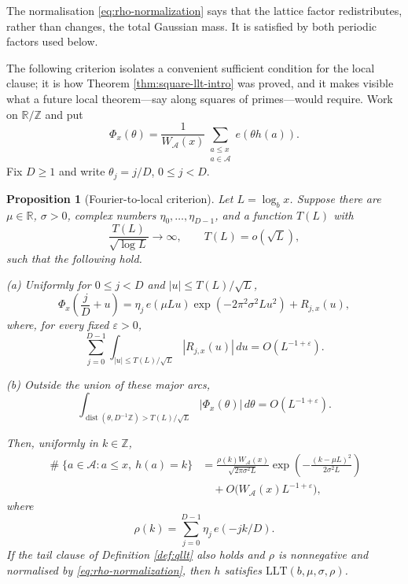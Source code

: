\documentclass[11pt,reqno]{amsart}
\theoremstyle{plain}
\newtheorem{proposition}[theorem]{Proposition}
\theoremstyle{definition}
\newcommand{\Z}{\mathbb{Z}}
\newcommand{\R}{\mathbb{R}}
\newcommand{\eps}{\varepsilon}
\newcommand{\ee}[1]{e\!\left(#1\right)}
\newcommand{\1}{\mathbf 1}
\DeclareMathOperator{\Card}{\#}
\DeclareMathOperator{\dist}{dist}
\begin{document}
The normalisation \eqref{eq:rho-normalization} says that the lattice factor redistributes, rather than changes, the total Gaussian mass.  It is satisfied by both periodic factors used below.

The following criterion isolates a convenient sufficient condition for the local clause; it is how Theorem \ref{thm:square-llt-intro} was proved, and it makes visible what a future local theorem---say along squares of primes---would require.  Work on $\R/\Z$ and put
\[
 \Phi_x(\theta)=\frac1{W_{\mathcal A}(x)}
 \sum_{\substack{a\le x\\a\in\mathcal A}}\ee{\theta h(a)}.
\]
Fix $D\ge1$ and write $\theta_j=j/D$, $0\le j<D$.

\begin{proposition}[Fourier-to-local criterion]\label{prop:fourier-criterion}
Let $L=\log_bx$.  Suppose there are $\mu\in\R$, $\sigma>0$, complex numbers $\eta_0,\ldots,\eta_{D-1}$, and a function $T(L)$ with
\[
 \frac{T(L)}{\sqrt{\log L}}\longrightarrow\infty,
 \qquad T(L)=o(\sqrt L),
\]
such that the following hold.

\smallskip
\noindent
(a) Uniformly for $0\le j<D$ and $|u|\le T(L)/\sqrt L$,
\begin{equation}\label{eq:fourier-major}
 \Phi_x\left(\frac jD+u\right)
 =\eta_j\,\ee{\mu Lu}\exp(-2\pi^2\sigma^2Lu^2)+R_{j,x}(u),
\end{equation}
where, for every fixed $\eps>0$,
\[
 \sum_{j=0}^{D-1}\int_{|u|\le T(L)/\sqrt L}|R_{j,x}(u)|\,du
 =O(L^{-1+\eps}).
\]

\smallskip
\noindent
(b) Outside the union of these major arcs,
\begin{equation}\label{eq:fourier-minor}
 \int_{\dist(\theta,D^{-1}\Z)>T(L)/\sqrt L}
 |\Phi_x(\theta)|\,d\theta
 =O(L^{-1+\eps}).
\end{equation}

Then, uniformly in $k\in\Z$,
\begin{equation}\label{eq:fourier-llt}
\begin{split}
 \Card\{a\in\mathcal A:a\le x,\ h(a)=k\}
 &=\frac{\rho(k)W_{\mathcal A}(x)}{\sqrt{2\pi\sigma^2L}}
 \exp\!\left(-\frac{(k-\mu L)^2}{2\sigma^2L}\right)\\
 &\quad+O\bigl(W_{\mathcal A}(x)L^{-1+\eps}\bigr),
\end{split}
\end{equation}
where
\begin{equation}\label{eq:rho-fourier}
 \rho(k)=\sum_{j=0}^{D-1}\eta_j\,\ee{-jk/D}.
\end{equation}
If the tail clause of Definition \ref{def:qllt} also holds and $\rho$ is nonnegative and normalised by \eqref{eq:rho-normalization}, then $h$ satisfies $\mathrm{LLT}(b,\mu,\sigma,\rho)$.
\end{proposition}
\end{document}
